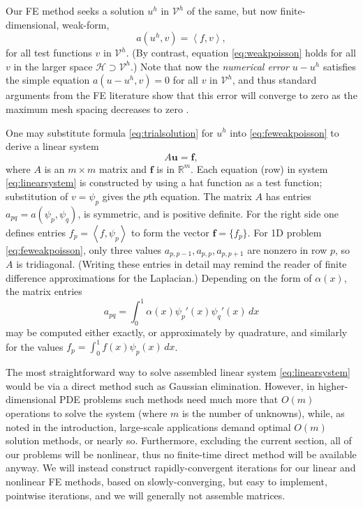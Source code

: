 \documentclass[letterpaper,final,12pt,reqno]{amsart}
\theoremstyle{claim}
\newcommand{\RR}{\mathbb{R}}
\newcommand{\bbf}{\mathbf{f}}
\newcommand{\bu}{\mathbf{u}}
\newcommand{\ip}[2]{\left<#1,#2\right>}
\numberwithin{equation}{section}
\numberwithin{figure}{section}
\numberwithin{table}{section}
\numberwithin{theorem}{section}
\begin{document}
Our FE method seeks a solution $u^h$ in $\mathcal{V}^h$ of the same, but now finite-dimensional, weak-form,
\begin{equation}
  a(u^h,v) = \ip{f}{v},  \label{eq:feweakpoisson}
\end{equation}
for all test functions $v$ in $\mathcal{V}^h$.  (By contrast, equation \eqref{eq:weakpoisson} holds for all $v$ in the larger space $\mathcal{H} \supset \mathcal{V}^h$.)  Note that now the \emph{numerical error} $u-u^h$ satisfies the simple equation $a(u-u^h,v)=0$ for all $v$ in $\mathcal{V}^h$, and thus standard arguments from the FE literature show that this error will converge to zero as the maximum mesh spacing decreases to zero \cite{Braess2007,Elmanetal2014}.

One may substitute formula \eqref{eq:trialsolution} for $u^h$ into \eqref{eq:feweakpoisson} to derive a linear system
\begin{equation}
A \bu = \bbf, \label{eq:linearsystem}
\end{equation}
where $A$ is an $m\times m$ matrix and $\bbf$ is in $\RR^m$.  Each equation (row) in system \eqref{eq:linearsystem} is constructed by using a hat function as a test function; substitution of $v=\psi_p$ gives the $p$th equation.  The matrix $A$ has entries $a_{pq} = a(\psi_p,\psi_q)$, is symmetric, and is positive definite.  For the right side one defines entries $f_p = \ip{f}{\psi_p}$ to form the vector $\bbf = \{f_p\}$.  For 1D problem \eqref{eq:feweakpoisson}, only three values $a_{p,p-1}, a_{p,p}, a_{p,p+1}$ are nonzero in row $p$, so $A$ is tridiagonal.  (Writing these entries in detail may remind the reader of finite difference approximations for the Laplacian.)  Depending on the form of $\alpha(x)$, the matrix entries
\begin{equation}
  a_{pq} = \int_0^1 \alpha(x) \psi_p'(x) \psi_q'(x)\,dx \label{eq:poissonentries}
\end{equation}
may be computed either exactly, or approximately by quadrature, and similarly for the values $f_p = \int_0^1 f(x) \psi_p(x)\,dx$.

The most straightforward way to solve assembled linear system \eqref{eq:linearsystem} would be via a direct method such as Gaussian elimination.  However, in higher-dimensional PDE problems such methods need much more that $O(m)$ operations to solve the system (where $m$ is the number of unknowns), while, as noted in the introduction, large-scale applications demand optimal $O(m)$ solution methods, or nearly so.  Furthermore, excluding the current section, all of our problems will be nonlinear, thus no finite-time direct method will be available anyway.  We will instead construct rapidly-convergent iterations for our linear and nonlinear FE methods, based on slowly-converging, but easy to implement, pointwise iterations, and we will generally not assemble matrices.
\end{document}
